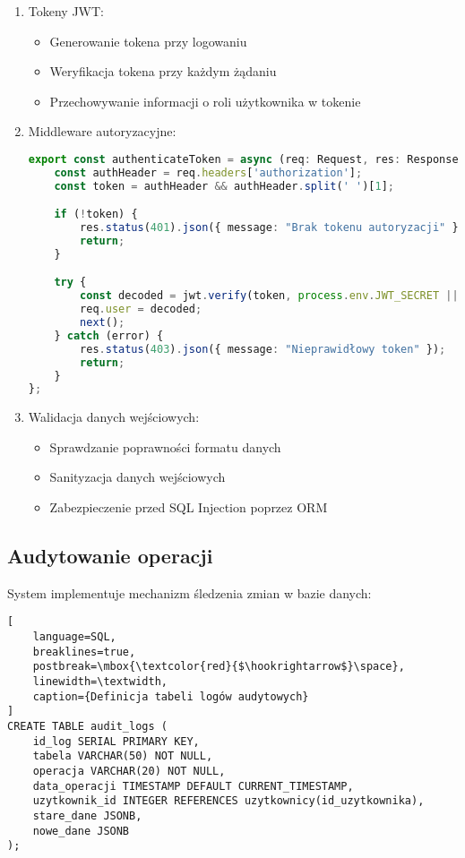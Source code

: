 \documentclass[12pt]{article}
\begin{document}
\begin{enumerate}
    \item Tokeny JWT:
    \begin{itemize}
        \item Generowanie tokena przy logowaniu
        \item Weryfikacja tokena przy każdym żądaniu
        \item Przechowywanie informacji o roli użytkownika w tokenie
    \end{itemize}
    \item Middleware autoryzacyjne:
    \begin{lstlisting}[language=TypeScript]
export const authenticateToken = async (req: Request, res: Response, next: NextFunction): Promise<void> => {
    const authHeader = req.headers['authorization'];
    const token = authHeader && authHeader.split(' ')[1];

    if (!token) {
        res.status(401).json({ message: "Brak tokenu autoryzacji" });
        return;
    }

    try {
        const decoded = jwt.verify(token, process.env.JWT_SECRET || 'secret-key') as JwtPayload;
        req.user = decoded;
        next();
    } catch (error) {
        res.status(403).json({ message: "Nieprawidłowy token" });
        return;
    }
};
    \end{lstlisting}

    \item Walidacja danych wejściowych:
    \begin{itemize}
        \item Sprawdzanie poprawności formatu danych
        \item Sanityzacja danych wejściowych
        \item Zabezpieczenie przed SQL Injection poprzez ORM
    \end{itemize}
\end{enumerate}
\subsection{Audytowanie operacji}
System implementuje mechanizm śledzenia zmian w bazie danych:

\begin{lstlisting}[
    language=SQL,
    breaklines=true,
    postbreak=\mbox{\textcolor{red}{$\hookrightarrow$}\space},
    linewidth=\textwidth,
    caption={Definicja tabeli logów audytowych}
]
CREATE TABLE audit_logs (
    id_log SERIAL PRIMARY KEY,
    tabela VARCHAR(50) NOT NULL,
    operacja VARCHAR(20) NOT NULL,
    data_operacji TIMESTAMP DEFAULT CURRENT_TIMESTAMP,
    uzytkownik_id INTEGER REFERENCES uzytkownicy(id_uzytkownika),
    stare_dane JSONB,
    nowe_dane JSONB
);
\end{lstlisting}
\end{document}
